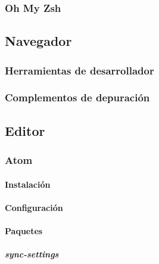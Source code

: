 \documentclass[a4paper,11pt,spanish]{sphinxmanual}
\begin{document}
\subsubsection{Oh My Zsh}
\label{\detokenize{introduccion:oh-my-zsh}}

\subsection{Navegador}
\label{\detokenize{introduccion:navegador}}

\subsubsection{Herramientas de desarrollador}
\label{\detokenize{introduccion:herramientas-de-desarrollador}}

\subsubsection{Complementos de depuración}
\label{\detokenize{introduccion:complementos-de-depuracion}}

\subsection{Editor}
\label{\detokenize{introduccion:editor}}

\subsubsection{Atom}
\label{\detokenize{introduccion:atom}}

\paragraph{Instalación}
\label{\detokenize{introduccion:instalacion}}

\paragraph{Configuración}
\label{\detokenize{introduccion:configuracion}}

\paragraph{Paquetes}
\label{\detokenize{introduccion:paquetes}}

\subparagraph{sync-settings}
\label{\detokenize{introduccion:sync-settings}}
\end{document}
